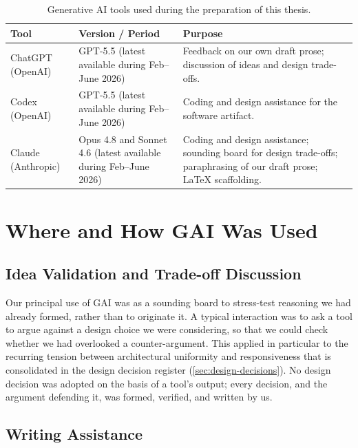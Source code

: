 \begin{table}[!htbp]
\centering
\small
\setlength{\tabcolsep}{4pt}
\renewcommand{\arraystretch}{1.2}
\begin{tabular}{@{}p{3.4cm}p{3.6cm}p{7.0cm}@{}}
\toprule
\textbf{Tool} & \textbf{Version / Period} & \textbf{Purpose} \\
\midrule
ChatGPT (OpenAI) & GPT-5.5 (latest available during Feb--June 2026) & Feedback on our own draft prose; discussion of ideas and design trade-offs. \\
\addlinespace
Codex (OpenAI) & GPT-5.5 (latest available during Feb--June 2026) & Coding and design assistance for the software artifact. \\
\addlinespace
Claude (Anthropic) & Opus 4.8 and Sonnet 4.6 (latest available during Feb--June 2026) & Coding and design assistance; sounding board for design trade-offs; paraphrasing of our draft prose; LaTeX scaffolding. \\
\bottomrule
\end{tabular}
\caption{Generative AI tools used during the preparation of this thesis.}
\label{tab:gai-tools}
\end{table}

\section{Where and How GAI Was Used}
\label{sec:ai-how-used}

\subsection{Idea Validation and Trade-off Discussion}
\label{sec:ai-tradeoff}

Our principal use of GAI was as a sounding board to stress-test reasoning we had already formed, rather than to originate it.
A typical interaction was to ask a tool to argue against a design choice we were considering, so that we could check whether we had overlooked a counter-argument.
This applied in particular to the recurring tension between architectural uniformity and responsiveness that is consolidated in the design decision register (\cref{sec:design-decisions}).
No design decision was adopted on the basis of a tool's output; every decision, and the argument defending it, was formed, verified, and written by us.

\subsection{Writing Assistance}

